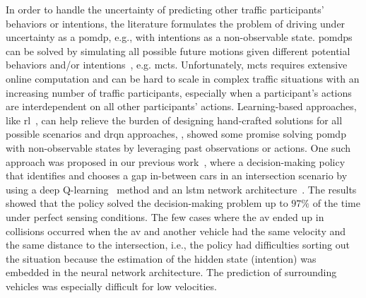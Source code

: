 In order to handle the uncertainty of predicting other traffic participants' behaviors or intentions, the literature formulates the problem of driving under uncertainty as a \gls{pomdp}, e.g., with intentions as a non-observable state. \gls{pomdp}s can be solved by simulating all possible future motions given different potential behaviors and/or intentions~\cite{Hubmann2017, Sunberg2017}, e.g. \gls{mcts}. Unfortunately, \gls{mcts} requires extensive online computation and can be hard to scale in complex traffic situations with an increasing number of traffic participants, especially when a participant's actions are interdependent on all other participants’ actions. 
Learning-based approaches, like \gls{rl}~\cite{Sutton2018, Isele2018}, can help relieve the burden of designing hand-crafted solutions for all possible scenarios and \Gls{drqn} approaches, \cite{HausknechtS15drqn, zhu2018improving}, showed some promise solving \gls{pomdp} with non-observable states by leveraging past observations or actions. %
One such approach was proposed in our previous work~\cite{Tram2018}, where a decision-making policy that identifies and chooses a gap in-between cars in an intersection scenario by using a deep Q-learning~\cite{Mnih2013} method and an \gls{lstm} network architecture~\cite{lstm1997}.
The results showed that the policy solved the decision-making problem up to $97\%$ of the time under perfect sensing conditions. The few cases where the \gls{av} ended up in collisions occurred when the \gls{av} and another vehicle had the same velocity and the same distance to the intersection, i.e., the policy had difficulties sorting out the situation because the estimation of the hidden state (intention) was embedded in the neural network architecture. The prediction of surrounding vehicles was especially difficult for low velocities. 

